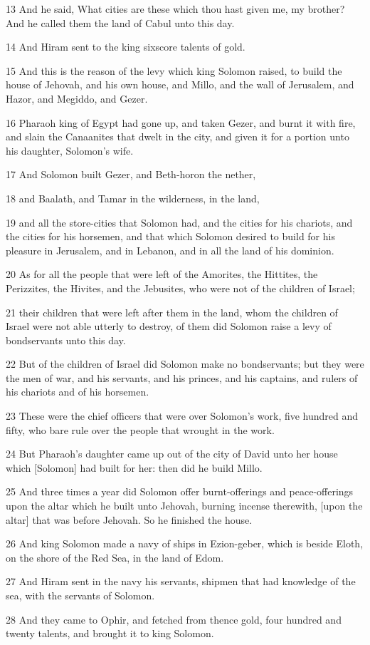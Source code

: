 \par 13 And he said, What cities are these which thou hast given me, my brother? And he called them the land of Cabul unto this day.
\par 14 And Hiram sent to the king sixscore talents of gold.
\par 15 And this is the reason of the levy which king Solomon raised, to build the house of Jehovah, and his own house, and Millo, and the wall of Jerusalem, and Hazor, and Megiddo, and Gezer.
\par 16 Pharaoh king of Egypt had gone up, and taken Gezer, and burnt it with fire, and slain the Canaanites that dwelt in the city, and given it for a portion unto his daughter, Solomon's wife.
\par 17 And Solomon built Gezer, and Beth-horon the nether,
\par 18 and Baalath, and Tamar in the wilderness, in the land,
\par 19 and all the store-cities that Solomon had, and the cities for his chariots, and the cities for his horsemen, and that which Solomon desired to build for his pleasure in Jerusalem, and in Lebanon, and in all the land of his dominion.
\par 20 As for all the people that were left of the Amorites, the Hittites, the Perizzites, the Hivites, and the Jebusites, who were not of the children of Israel;
\par 21 their children that were left after them in the land, whom the children of Israel were not able utterly to destroy, of them did Solomon raise a levy of bondservants unto this day.
\par 22 But of the children of Israel did Solomon make no bondservants; but they were the men of war, and his servants, and his princes, and his captains, and rulers of his chariots and of his horsemen.
\par 23 These were the chief officers that were over Solomon's work, five hundred and fifty, who bare rule over the people that wrought in the work.
\par 24 But Pharaoh's daughter came up out of the city of David unto her house which [Solomon] had built for her: then did he build Millo.
\par 25 And three times a year did Solomon offer burnt-offerings and peace-offerings upon the altar which he built unto Jehovah, burning incense therewith, [upon the altar] that was before Jehovah. So he finished the house.
\par 26 And king Solomon made a navy of ships in Ezion-geber, which is beside Eloth, on the shore of the Red Sea, in the land of Edom.
\par 27 And Hiram sent in the navy his servants, shipmen that had knowledge of the sea, with the servants of Solomon.
\par 28 And they came to Ophir, and fetched from thence gold, four hundred and twenty talents, and brought it to king Solomon.

